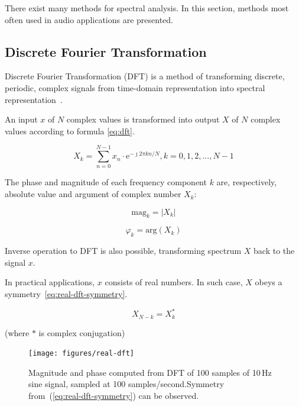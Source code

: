 \documentclass[english,bachelor,a4paper,oneside]{ppfcmthesis}
\begin{document}
There exist many methods for spectral analysis. In this section, methods most often used in audio applications are presented.

\subsection{Discrete Fourier Transformation}
\label{subsec:dft}
Discrete Fourier Transformation (DFT) is a method of transforming discrete, periodic, complex signals from time-domain representation into spectral representation~\cite{DiscreteDSP}.

An input $x$ of $N$ complex values is transformed into output $X$ of $N$ complex values according to formula \ref{eq:dft}.~\cite{JOSDFT}

\begin{equation}
\label{eq:dft}
X_{k} = \sum_{n = 0}^{N-1} x_{n}\cdot {\textrm{e}}^{-\jmath 2\pi kn/N}, k = 0, 1, 2, ..., N - 1
\end{equation}

The phase and magnitude of each frequency component $k$ are, respectively, absolute value and argument of complex number $X_{k}$:

\begin{equation}
\textrm{mag}_{k} = |X_k|
\end{equation}

\begin{equation}
\varphi_{k} = \textrm{arg}(X_k)
\end{equation}

Inverse operation to DFT is also possible, transforming spectrum $X$ back to the signal $x$.

In practical applications, $x$ consists of real numbers. In such case, $X$ obeys a symmetry~\ref{eq:real-dft-symmetry}.

\begin{equation}
\label{eq:real-dft-symmetry}
X_{N-k} = X_{k}^{*}
\end{equation}

(where $*$ is complex conjugation)

\begin{figure}[h]
  \centering
  \texttt{[image: figures/real-dft]}
  \caption[Magnitude and phase computed from DFT]{Magnitude and phase computed from DFT of 100 samples of 10\,Hz sine signal, sampled at 100 samples/second.\newline Symmetry from~(\ref{eq:real-dft-symmetry}) can be observed.}
  \label{fig:real-dft}
\end{figure}
\end{document}
